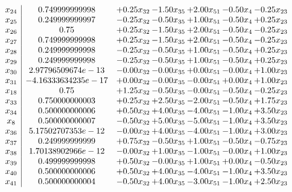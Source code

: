 \documentclass[8pt]{article}
\begin{document}
\[\begin{array}{c| c c@{\hskip 2pt} c@{\hskip 2pt} c@{\hskip 2pt} c@{\hskip 2pt} c@{\hskip 2pt} }
 x_{24}   &  0.749999999998 & +  0.25 x_{32} & -1.50 x_{35} & +  2.00 x_{51} & -0.50 x_{4} & -0.25 x_{23}\\
 x_{25}   &  0.249999999997 & -0.25 x_{32} & -0.50 x_{35} & +  1.00 x_{51} & -0.50 x_{4} & +  0.25 x_{23}\\
 x_{26}   &  0.75 & +  0.25 x_{32} & -1.50 x_{35} & +  2.00 x_{51} & -0.50 x_{4} & -0.25 x_{23}\\
 x_{27}   &  0.749999999998 & +  0.25 x_{32} & -1.50 x_{35} & +  2.00 x_{51} & -0.50 x_{4} & -0.25 x_{23}\\
 x_{28}   &  0.249999999998 & -0.25 x_{32} & -0.50 x_{35} & +  1.00 x_{51} & -0.50 x_{4} & +  0.25 x_{23}\\
 x_{29}   &  0.249999999998 & -0.25 x_{32} & -0.50 x_{35} & +  1.00 x_{51} & -0.50 x_{4} & +  0.25 x_{23}\\
 x_{30}   &  2.97796509674e-13 & -0.00 x_{32} & -0.00 x_{35} & +  0.00 x_{51} & -0.00 x_{4} & +  1.00 x_{23}\\
 x_{31}   &  -4.16333634235e-17 & +  0.00 x_{32} & -0.00 x_{35} & -0.00 x_{51} & +  0.00 x_{4} & +  1.00 x_{23}\\
 x_{18}   &  0.75 & +  1.25 x_{32} & -0.50 x_{35} & -0.00 x_{51} & -0.50 x_{4} & -0.25 x_{23}\\
 x_{33}   &  0.750000000003 & +  0.25 x_{32} & +  2.50 x_{35} & -2.00 x_{51} & -0.50 x_{4} & +  1.75 x_{23}\\
 x_{34}   &  0.500000000006 & +  0.50 x_{32} & +  4.00 x_{35} & -4.00 x_{51} & -1.00 x_{4} & +  3.50 x_{23}\\
 x_{8}   &  0.500000000007 & -0.50 x_{32} & +  5.00 x_{35} & -5.00 x_{51} & -1.00 x_{4} & +  3.50 x_{23}\\
 x_{36}   &  5.17502707353e-12 & -0.00 x_{32} & +  4.00 x_{35} & -4.00 x_{51} & -1.00 x_{4} & +  3.00 x_{23}\\
 x_{37}   &  0.249999999999 & +  0.75 x_{32} & -0.50 x_{35} & +  1.00 x_{51} & -0.50 x_{4} & -0.75 x_{23}\\
 x_{38}   &  1.70138902966e-12 & -0.00 x_{32} & +  1.00 x_{35} & -1.00 x_{51} & -0.00 x_{4} & +  1.00 x_{23}\\
 x_{39}   &  0.499999999998 & +  0.50 x_{32} & -0.00 x_{35} & +  1.00 x_{51} & +  0.00 x_{4} & -0.50 x_{23}\\
 x_{40}   &  0.500000000006 & +  0.50 x_{32} & +  4.00 x_{35} & -4.00 x_{51} & -1.00 x_{4} & +  3.50 x_{23}\\
 x_{41}   &  0.500000000004 & -0.50 x_{32} & +  4.00 x_{35} & -3.00 x_{51} & -1.00 x_{4} & +  2.50 x_{23}\\

\end{array}\]
\end{document}
